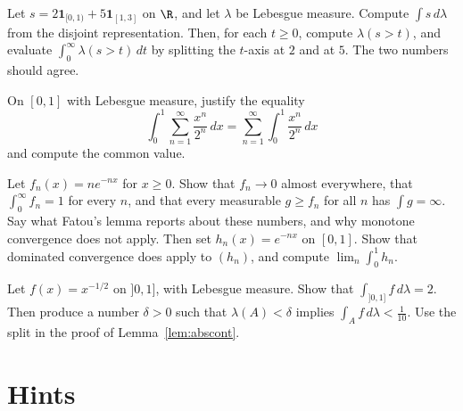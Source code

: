 \begin{exercise}[$\star$]\label{ex:v7c08a}
Let \(s=2\mathbf 1_{[0,1)}+5\mathbf 1_{[1,3]}\) on \(\R\), and let \(\lambda\) be Lebesgue measure. Compute \(\int s\,d\lambda\) from the disjoint representation. Then, for each \(t\ge0\), compute \(\lambda(s>t)\), and evaluate \(\int_0^\infty\lambda(s>t)\,dt\) by splitting the \(t\)-axis at \(2\) and at \(5\). The two numbers should agree.
\end{exercise}

\begin{exercise}[$\star\star$]\label{ex:v7c08b}
On \([0,1]\) with Lebesgue measure, justify the equality
\[
\int_0^1\sum_{n=1}^\infty\frac{x^n}{2^n}\,dx=\sum_{n=1}^\infty\int_0^1\frac{x^n}{2^n}\,dx
\]
and compute the common value.
\end{exercise}

\begin{exercise}[$\star\star$]\label{ex:v7c08c}
Let \(f_n(x)=ne^{-nx}\) for \(x\ge0\). Show that \(f_n\to0\) almost everywhere, that \(\int_0^\infty f_n=1\) for every \(n\), and that every measurable \(g\ge f_n\) for all \(n\) has \(\int g=\infty\). Say what Fatou's lemma reports about these numbers, and why monotone convergence does not apply. Then set \(h_n(x)=e^{-nx}\) on \([0,1]\). Show that dominated convergence does apply to \((h_n)\), and compute \(\lim_n\int_0^1 h_n\).
\end{exercise}

\begin{exercise}[$\star\star$]\label{ex:v7c08d}
Let \(f(x)=x^{-1/2}\) on \(]0,1]\), with Lebesgue measure. Show that \(\int_{]0,1]}f\,d\lambda=2\). Then produce a number \(\delta>0\) such that \(\lambda(A)<\delta\) implies \(\int_A f\,d\lambda<\frac1{10}\). Use the split in the proof of Lemma~\ref{lem:abscont}.
\end{exercise}

\section{Hints}

